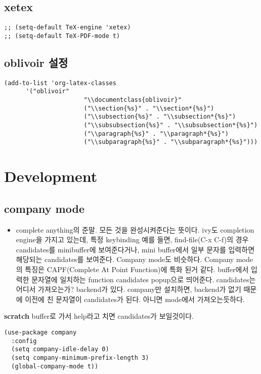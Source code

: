 \documentclass[11pt]{article}
\begin{document}
\subsection*{xetex}
\label{sec:orgf422a2d}
\begin{verbatim}
;; (setq-default TeX-engine 'xetex)
;; (setq-default TeX-PDF-mode t)
\end{verbatim}

\subsection*{oblivoir 설정}
\label{sec:org577260c}
\begin{verbatim}
(add-to-list 'org-latex-classes
	  '("oblivoir"
				      "\\documentclass{oblivoir}"
				      ("\\section{%s}" . "\\section*{%s}")
				      ("\\subsection{%s}" . "\\subsection*{%s}")
				      ("\\subsubsection{%s}" . "\\subsubsection*{%s}")
				      ("\\paragraph{%s}" . "\\paragraph*{%s}")
				      ("\\subparagraph{%s}" . "\\subparagraph*{%s}")))
\end{verbatim}
\section*{Development}
\label{sec:orgcca9d27}
\subsection*{company mode}
\label{sec:org9f0e390}
\begin{itemize}
\item complete anything의 준말. 모든 것을 완성시켜준다는 뜻이다. ivy도 completion engine을 가지고 있는데, 특정 keybinding 예를 들면, find-file(C-x C-f)의 경우 candidates를 minibuffer에 보여준다거나, mini buffer에서 일부 문자를 입력하면 해당되는 candidates를 보여준다. Company mode도 비슷하다. Company mode의 특징은 CAPF(Complete At Point Function)에 특화 된거 같다. buffer에서 입력한 문자열에 일치하는 function candidates popup으로 띄어준다. candidates는 어디서 가져오는가? backend가 있다. company만 설치하면, backend가 없기 때문에 이전에 친 문자열이 candidates가 된다. 아니면 mode에서 가져오는듯하다.
\end{itemize}
\textbf{scratch} buffer로 가서 help라고 치면 candidates가 보일것이다.
\begin{verbatim}
(use-package company
  :config
  (setq company-idle-delay 0)
  (setq company-minimum-prefix-length 3)
  (global-company-mode t))
\end{verbatim}
\end{document}
